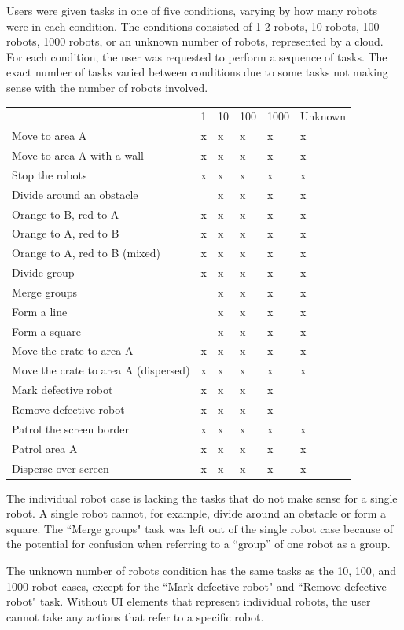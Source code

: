 \documentclass[]{article}
\begin{document}
Users were given tasks in one of five conditions, varying by how many robots were in each condition. 
The conditions consisted of 1-2 robots, 10 robots, 100 robots, 1000 robots, or an unknown number of robots, represented by a cloud. 
For each condition, the user was requested to perform a sequence of tasks. 
The exact number of tasks varied between conditions due to some tasks not making sense with the number of robots involved. 

\begin{tabular}{l|l|l|l|l|l}
& 1 & 10 & 100 & 1000 & Unknown \\
Move to area A & x & x & x & x & x\\
Move to area A with a wall & x & x & x & x & x \\
Stop the robots & x & x & x & x & x\\
Divide around an obstacle & & x & x & x & x \\
Orange to B, red to A & x & x & x & x & x \\
Orange to A, red to B & x & x & x & x & x \\
Orange to A, red to B (mixed) & x & x & x & x & x \\
Divide group & x & x & x & x & x \\
Merge groups & & x & x & x & x \\
Form a line & & x & x & x & x \\
Form a square & & x & x & x & x \\
Move the crate to area A & x & x & x & x & x \\
Move the crate to area A (dispersed) & x & x & x & x & x\\
Mark defective robot & x & x & x & x & \\
Remove defective robot & x & x & x & x &  \\
Patrol the screen border & x & x & x & x & x \\
Patrol area A & x & x & x & x & x \\
Disperse over screen & x & x & x & x & x \\
\end{tabular}

The individual robot case is lacking the tasks that do not make sense for a single robot. A single robot cannot, for example, divide around an obstacle or form a square. 
The ``Merge groups" task was left out of the single robot case because of the potential for confusion when referring to a ``group'' of one robot as a group. 

The unknown number of robots condition has the same tasks as the 10, 100, and 1000 robot cases, except for the ``Mark defective robot" and ``Remove defective robot" task. 
Without UI elements that represent individual robots, the user cannot take any actions that refer to a specific robot. 
\end{document}
